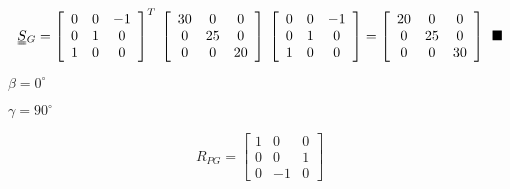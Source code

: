 \documentclass[onecolumn,11pt]{report}
\def\lthtmlcheckvsize{\ifdim\ht\sizebox<\vsize 
  \ifdim\wd\sizebox<\hsize\expandafter\hfill\fi \expandafter\vfill
  \else\expandafter\vss\fi}%
\begin{document}
{\newpage\clearpage
{}%
\begin{displaymath}\uuline{S}{}_G
=
\left[
\begin{array}{ccc}
0  & 0  & -1 \\
0  & 1  & 0 \\
1  & 0  & 0
\end{array}
\right]^T
\:
\left[
\begin{array}{ccc}
30 & 0  & 0 \\
0  & 25 & 0 \\
0  &  0 & 20
\end{array}
\right]
\:
\left[
\begin{array}{ccc}
0  & 0  & -1 \\
0  & 1  & 0 \\
1  & 0  & 0
\end{array}
\right]
=
\left[
\begin{array}{ccc}
20 & 0  & 0 \\
0  & 25 & 0 \\
0  &  0 & 30
\end{array}
\right]
\: \: \blacksquare\end{displaymath}%
\lthtmldisplayZ
\lthtmlcheckvsize\clearpage}

{\newpage\clearpage
{}%
$ \beta = 0^{\circ}$%
\lthtmlindisplaymathZ
\lthtmlcheckvsize\clearpage}

{\newpage\clearpage
{}%
$ \gamma = 90^{\circ}$%
\lthtmlindisplaymathZ
\lthtmlcheckvsize\clearpage}

{\newpage\clearpage
{}%
\begin{displaymath}R_{PG}
=
\left[
\begin{array}{ccc}
1  & 0  & 0 \\
0  & 0  & 1 \\
0  & -1 & 0
\end{array}
\right]\end{displaymath}%
\lthtmldisplayZ
\lthtmlcheckvsize\clearpage}
\end{document}
